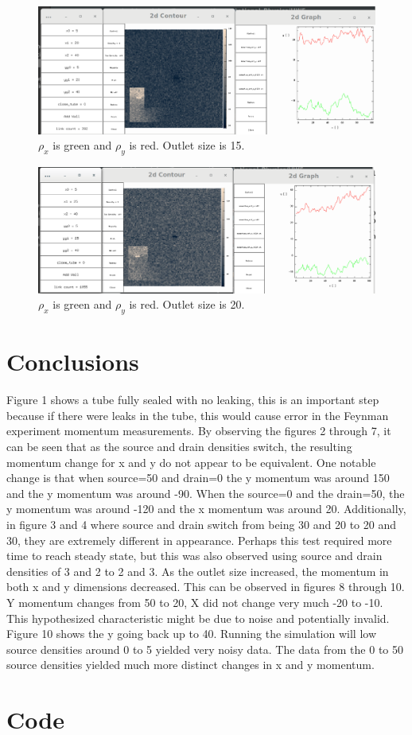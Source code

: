 \documentclass{article}
\begin{document}
\begin{figure}[H]
\centering
\includegraphics[scale=0.25]{df_15.png}
\caption{\label{fig} $\rho_x$ is green and $\rho_y$ is red. Outlet size is 15.}
\end{figure}

\begin{figure}[H]
\centering
\includegraphics[scale=0.25]{df_20.png}
\caption{\label{fig} $\rho_x$ is green and $\rho_y$ is red. Outlet size is 20.}
\end{figure}



\section{Conclusions}
Figure 1 shows a tube fully sealed with no leaking, this is an important step because if there were leaks in the tube, this would cause error in the Feynman experiment momentum measurements.\newline
By observing the figures 2 through 7, it can be seen that as the source and drain densities switch, the resulting momentum change for x and y do not appear to be equivalent. One notable change is that when source=50 and drain=0 the y momentum was around 150 and the y momentum was around -90. When the source=0 and the drain=50, the y momentum was around -120 and the x momentum was around 20. Additionally, in figure 3 and 4 where source and drain switch from being 30 and 20 to 20 and 30, they are extremely different in appearance. Perhaps this test required more time to reach steady state, but this was also observed using source and drain densities of 3 and 2 to 2 and 3.\newline
As the outlet size increased, the momentum in both x and y dimensions decreased. This can be observed in figures 8 through 10. Y momentum changes from 50 to 20, X did not change very much -20 to -10. This hypothesized characteristic might be due to noise and potentially invalid. Figure 10 shows the y going back up to 40.
Running the simulation will low source densities around 0 to 5 yielded very noisy data. The data from the 0 to 50 source densities yielded much more distinct changes in x and y momentum.


\appendix
\section{Code}

\end{document}
